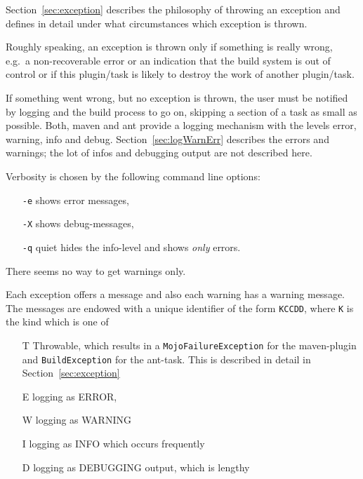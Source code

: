 \documentclass[12pt]{book}
\begin{document}
Section~\ref{sec:exception} describes 
the philosophy of throwing an exception and 
defines in detail under what circumstances which exception is thrown. 

Roughly speaking, an exception is thrown only if something is really wrong, 
e.g.~a non-recoverable error or an indication 
that the build system is out of control or if this plugin/task 
is likely to destroy the work of another plugin/task. 

If something went wrong, but no exception is thrown, 
the user must be notified by logging 
and the build process to go on, 
skipping a section of a task as small as possible. 
Both, maven and ant provide a logging mechanism 
with the levels error, warning, info and debug. 
Section~\ref{sec:logWarnErr} describes the errors and warnings; 
the lot of infos and debugging output are not described here. 

Verbosity is chosen by the following command line options: 
%
\begin{itemize}
\item[\texttt{-e}] shows error messages, 
\item[\texttt{-X}] shows debug-messages, 
\item[\texttt{-q}] quiet hides the info-level and shows {\em only\/} errors. 
\end{itemize}
%
There seems no way to get warnings only. 

Each exception offers a message and also each warning has a warning message. 
The messages are endowed with a unique identifier of the form 
\texttt{KCCDD}, where \texttt{K} is the kind which is one of 
%
\begin{itemize}
\item[T] Throwable, 
which results in a \texttt{MojoFailureException} for the maven-plugin 
and \texttt{BuildException} for the ant-task. 
This is described in detail in Section~\ref{sec:exception} 
\item[E] logging as ERROR, 
\item[W] logging as WARNING 
\item[I] logging as INFO which occurs frequently
\item[D] logging as DEBUGGING output, which is lengthy 
\end{itemize}
\end{document}
